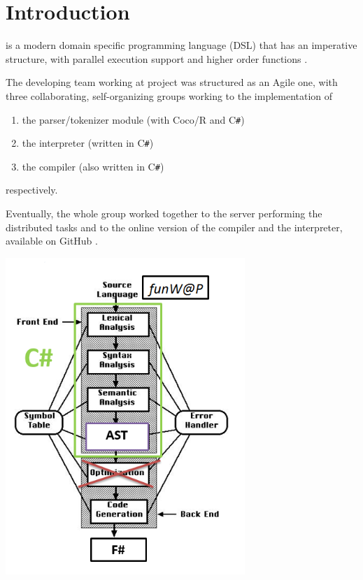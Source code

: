 \chapter{Introduction}

\fwap is a modern domain specific programming language (DSL) that has an imperative structure, with parallel execution support and higher order functions \cite{exercise}. 

The developing team working at project was structured as an Agile one, with three collaborating, self-organizing groups working to the implementation of
\begin{enumerate}
	\item the parser/tokenizer module (with Coco/R and C\texttt{\#})
	\item the interpreter (written in C\texttt{\#})
	\item the \fsharp compiler (also written in C\texttt{\#})
\end{enumerate}
respectively. 

Eventually, the whole group worked together to the server performing the distributed tasks and to the online version of the compiler and the interpreter, available on GitHub \cite{proj}.
\begin{center}
\includegraphics[height=12cm]{images/projectStructure}\\
\end{center}
